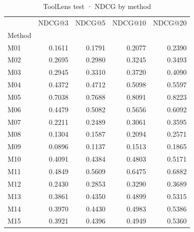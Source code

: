 \begin{table}
\caption{ToolLens test · NDCG by method}
\label{tab:ToolLens-test-comparison-comparison-ndcg}
\begin{tabular}{lrrrr}
\toprule
 & NDCG@3 & NDCG@5 & NDCG@10 & NDCG@20 \\
Method &  &  &  &  \\
\midrule
M01 & 0.1611 & 0.1791 & 0.2077 & 0.2390 \\
M02 & 0.2695 & 0.2980 & 0.3245 & 0.3493 \\
M03 & 0.2945 & 0.3310 & 0.3720 & 0.4090 \\
M04 & 0.4372 & 0.4712 & 0.5098 & 0.5597 \\
M05 & 0.7038 & 0.7688 & 0.8091 & 0.8223 \\
M06 & 0.4479 & 0.5082 & 0.5656 & 0.6092 \\
M07 & 0.2211 & 0.2489 & 0.3061 & 0.3595 \\
M08 & 0.1304 & 0.1587 & 0.2094 & 0.2571 \\
M09 & 0.0896 & 0.1137 & 0.1513 & 0.1865 \\
M10 & 0.4091 & 0.4384 & 0.4803 & 0.5171 \\
M11 & 0.4849 & 0.5609 & 0.6475 & 0.6882 \\
M12 & 0.2430 & 0.2853 & 0.3290 & 0.3689 \\
M13 & 0.3861 & 0.4350 & 0.4899 & 0.5315 \\
M14 & 0.3970 & 0.4430 & 0.4983 & 0.5386 \\
M15 & 0.3921 & 0.4396 & 0.4949 & 0.5360 \\
\bottomrule
\end{tabular}
\end{table}

